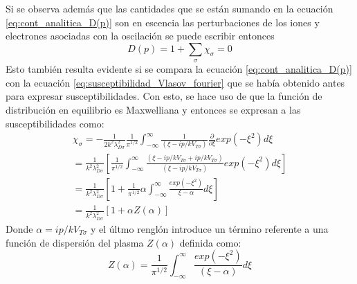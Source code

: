 \documentclass[../tesis_main_file.tex]{subfile}
\begin{document}
Si se observa además que las cantidades que se están sumando en la ecuación \ref{eq:cont_analitica_D(p)} son en escencia las perturbaciones de los iones y electrones asociadas con la oscilación se puede escribir entonces
\begin{equation}
\label{eq:D(p)_como_suma_de_susceptibilidades}
D(p)=1 + \sum_{\sigma}\chi_{\sigma}=0
\end{equation}
Esto también resulta evidente si se compara la ecuación \ref{eq:cont_analitica_D(p)} con la ecuación \ref{eq:susceptibilidad_Vlasov_fourier} que se había obtenido antes para expresar susceptibilidades. Con esto, se hace uso de que la función de distribución en equilibrio es Maxwelliana y entonces se expresan a las susceptibilidades como:
\begin{multline}
\label{eq:susceptibilidad_Landau}
\chi_{\sigma} = -\frac{1}{2k^2 \lambda ^2_{D\sigma}}\frac{1}{\pi^{1/2}}\int ^{\infty}_{-\infty}\frac{1}{(\xi - ip/kV_{T\sigma})}\frac{\partial}{\partial \xi}exp(-\xi ^2)d\xi\\
= \frac{1}{k^2 \lambda ^2_{D\sigma}}\left[ \frac{1}{\pi ^{1/2}}\int ^{\infty}_{-\infty} \frac{(\xi - ip/kV_{T\sigma}+ ip/kV_{T\sigma})}{(\xi - ip/kV_{T\sigma})}exp(-\xi ^2)d\xi\right]\\
=\frac{1}{k^2 \lambda ^2_{D\sigma}}\left[1 + \frac{1}{\pi ^{1/2}}\alpha\int^{\infty}_{-\infty}\frac{exp(-\xi ^2)}{\xi -\alpha}d\xi\right]\\
= \frac{1}{k^2 \lambda ^2_{D\sigma}}\left[1+\alpha Z(\alpha)\right]
\end{multline}
Donde $\alpha = ip/kV_{T\sigma}$ y el últmo renglón introduce un término referente a una función de dispersión del plasma $Z(\alpha)$ definida como:
\begin{equation}
\label{eq:Z_dispersion_plasma}
Z(\alpha) =\frac{1}{\pi ^{1/2}}\int^{\infty}_{-\infty}\frac{exp(-\xi ^2)}{(\xi- \alpha)}d\xi
\end{equation}
\end{document}
